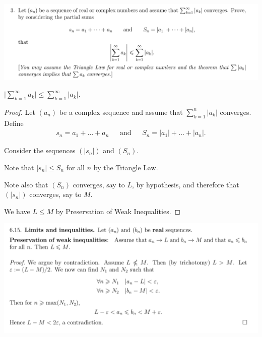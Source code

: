 \documentclass[12pt]{article}
\begin{document}
\newpage
\subsection{}
\begin{mdframed}
\includegraphics[width=400pt]{img/analysis--oxford-M2-I-5-3.png}
\end{mdframed}
\begin{claim*}
  $\Big|\sum\limits_{k=1}^\infty a_k\Big| \leq \sum\limits_{k=1}^\infty |a_k|$.
\end{claim*}

\begin{proof}
  Let $(a_n)$ be a complex sequence and assume that $\sum_{k=1}^n |a_k|$ converges.
  Define
  \begin{align*}
    s_n = a_1 + \ldots + a_n ~~~~~~~\text{and}~~~~~~~ S_n = |a_1| + \ldots + |a_n|.
  \end{align*}

  Consider the sequences $(|s_n|)$ and $(S_n)$.

  Note that $|s_n| \leq S_n$ for all $n$ by the Triangle Law.

  Note also that $(S_n)$ converges, say to $L$, by hypothesis, and therefore that $(|s_n|)$
  converges, say to $M$.

  We have $L \leq M$ by Preservation of Weak Inequalities.
\end{proof}

\begin{mdframed}
  \includegraphics[width=400pt]{img/analysis--oxford-M2-I-preservation-weak-inequalities.png}
\end{mdframed}
\end{document}
